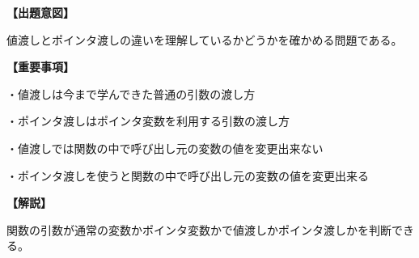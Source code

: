 \noindent \textbf{【出題意図】}

\noindent 値渡しとポインタ渡しの違いを理解しているかどうかを確かめる問題である。

\vspace{1em}
\noindent \textbf{【重要事項】}

\medskip
\noindent ・値渡しは今まで学んできた普通の引数の渡し方

\medskip
\noindent ・ポインタ渡しはポインタ変数を利用する引数の渡し方

\medskip
\noindent ・値渡しでは関数の中で呼び出し元の変数の値を変更出来ない

\medskip
\noindent ・ポインタ渡しを使うと関数の中で呼び出し元の変数の値を変更出来る

\vspace{1em}
\noindent \textbf{【解説】}

\noindent 関数の引数が通常の変数かポインタ変数かで値渡しかポインタ渡しかを判断できる。
